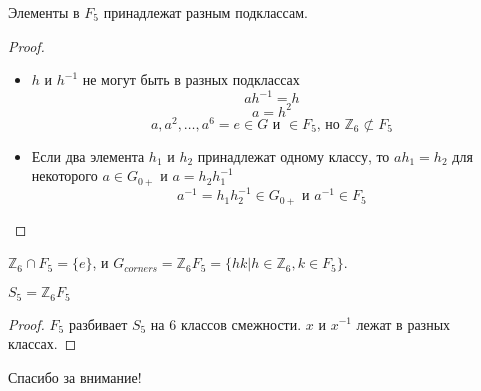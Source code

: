 \documentclass{beamer}
\begin{document}
\begin{frame}
\begin{theorem}
	Элементы в $F_5$ принадлежат разным подклассам.
\end{theorem}
\begin{proof}
\begin{itemize}
	\item $h$ и $h^{-1}$ не могут быть в разных подклассах
	$$ah^{-1}=h$$
	$$a=h^2$$
	$$a,a^2,\ldots,a^6=e\in G\text{ и }\in F_5\text{, но }\mathbb{Z}_6\not\subset F_5$$
	\item
	Если два элемента $h_1$ и $h_2$ принадлежат одному классу, то $ah_1=h_2$ для некоторого $a\in G_{0+}$ и $a=h_2h_1^{-1}$ $$a^{-1}=h_1h_2^{-1}\in G_{0+}\text{ и }a^{-1}\in F_5$$
\end{itemize}
\end{proof}
$\mathbb{Z}_6\cap F_5=\{e\}$, и $G_{corners}=\mathbb{Z}_6F_5=\{hk|h\in\mathbb{Z}_6,k\in F_5\}$.
\end{frame}


\begin{frame}
\begin{theorem}
$S_5=\mathbb{Z}_6F_5$
\end{theorem}
\begin{proof}
	$F_5$ разбивает $S_5$ на 6 классов смежности.
	$x$ и $x^{-1}$ лежат в разных классах.
	
\end{proof}
\end{frame}


\begin{frame}
\Huge{\centerline{Спасибо за внимание!}}
\end{frame}

\end{document}
